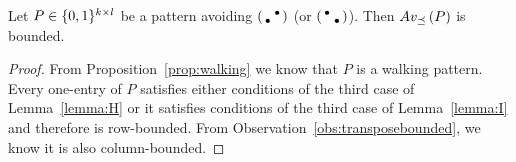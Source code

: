 \begin{lemma}
\label{lemma:walkpat}
Let $P\in\{0,1\}^{k\times l}$ be a pattern avoiding $\left(\begin{smallmatrix} &\bullet\\\bullet& \end{smallmatrix}\right)$ (or $\left(\begin{smallmatrix}\bullet& \\ &\bullet\end{smallmatrix}\right)$). Then $Av_{\preceq}\left(P\right)$ is bounded.
\end{lemma}
\begin{proof}
From Proposition~\ref{prop:walking} we know that $P$ is a walking pattern. Every one-entry of $P$ satisfies either conditions of the third case of Lemma~\ref{lemma:H} or it satisfies conditions of the third case of Lemma~\ref{lemma:I} and therefore is row-bounded. From Observation~\ref{obs:transposebounded}, we know it is also column-bounded.
\end{proof}

